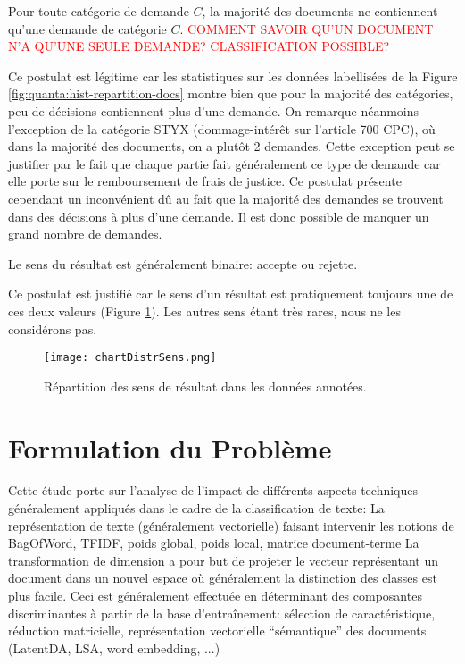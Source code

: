 \begin{postulat}\label{postulat:sens:unedemande}
Pour toute catégorie de demande $C$, la majorité des documents ne contiennent qu'une demande de catégorie $C$. \textcolor{red}{COMMENT SAVOIR QU'UN DOCUMENT N'A QU'UNE SEULE DEMANDE? CLASSIFICATION POSSIBLE?}
\end{postulat} 
Ce postulat est légitime car les statistiques sur les données labellisées de la Figure \ref{fig:quanta:hist-repartition-docs} montre bien que pour la majorité des catégories, peu de décisions contiennent plus d'une demande. On remarque néanmoins l'exception de la catégorie STYX (dommage-intérêt sur l'article 700 CPC), où dans la majorité des documents, on a plutôt 2 demandes. Cette exception peut se justifier par le fait que chaque partie fait généralement ce type de demande car elle porte sur le remboursement de frais de justice. Ce postulat présente cependant un inconvénient dû au fait que la majorité des demandes se trouvent dans des décisions à plus d'une demande. Il est donc possible de manquer un grand nombre de demandes. %

\begin{postulat}\label{postulat:sens:sensbinaire}
Le sens du résultat est généralement binaire: accepte ou rejette.
\end{postulat} 
Ce postulat est justifié car le sens d'un résultat est pratiquement toujours une de ces deux valeurs (Figure \ref{stat-sensrst}). Les autres sens étant très rares, nous ne les considérons pas.

\begin{figure}
\texttt{[image: chartDistrSens.png]}
\caption{Répartition des sens de résultat dans les données annotées.}\label{stat-sensrst}
\end{figure}
\section{Formulation du Problème}
\label{sec:sensresultat:probleme}

Cette étude porte sur l'analyse de l'impact de différents aspects techniques généralement appliqués dans le cadre de la classification de texte:
La représentation de texte (généralement vectorielle) faisant intervenir les notions de BagOfWord, TFIDF, poids global, poids local, matrice document-terme
La transformation de dimension a pour but de projeter le vecteur représentant un document dans un nouvel espace où généralement la distinction des classes est plus facile. Ceci est généralement effectuée en déterminant des composantes discriminantes à partir de la base d'entraînement: sélection de caractéristique, réduction matricielle, représentation vectorielle “sémantique” des documents (LatentDA, LSA, word embedding, ...)

